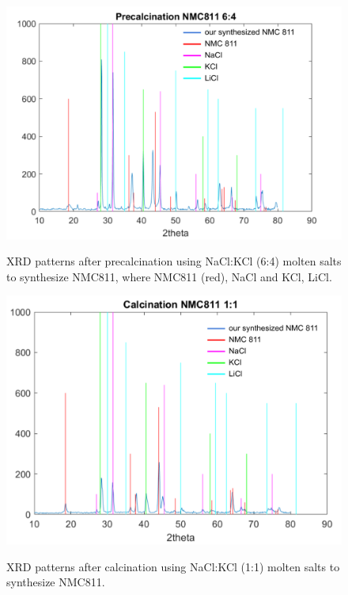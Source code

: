 \documentclass{article}
\begin{document}
\begin{figure}[H]
  \centering
  \begin{minipage}{0.7\textwidth}
    \centering
    \includegraphics[width=\textwidth]{XRD3.png}
  \caption{XRD patterns after precalcination using NaCl:KCl (6:4) molten salts to synthesize NMC811,  where NMC811 \cite{mambo} (red), NaCl and KCl\cite{tango}, LiCl.}
    \label{XRD3}
  \end{minipage}
  \vfill
  \begin{minipage}{0.7\textwidth}
    \centering
    \includegraphics[width=\textwidth]{XRD4.png}
    \label{fig:XRD_calc}
  \end{minipage}
  \caption{XRD patterns after calcination using NaCl:KCl (1:1) molten salts to synthesize NMC811.}
  \label{XRD4}
\end{figure}
\end{document}
